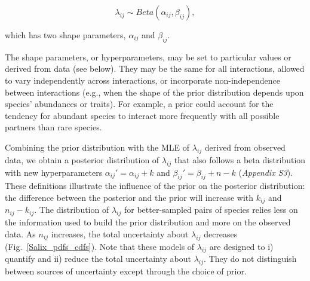 \documentclass[12pt]{article}
\begin{document}
\begin{spacing}{2.0}
    \begin{equation}
          \lambda_{ij} \sim Beta(\alpha_{ij},\beta_{ij}) , \label{prior}
        \end{equation}

        \noindent which has two shape parameters, $\alpha_{ij}$ and $\beta_{ij}$. 


    The shape parameters, or hyperparameters, may be set to particular values or derived from data (see below). They may be the same for all interactions, allowed to vary independently across interactions, or incorporate non-independence between interactions (e.g., when the shape of the prior distribution depends upon species' abundances or traits). For example, a prior could account for the tendency for abundant species to interact more frequently with all possible partners than rare species.


    Combining the prior distribution with the MLE of $\lambda_{ij}$ derived from observed data, we obtain a posterior distribution of $\lambda_{ij}$ that also follows a beta distribution with new hyperparameters $\alpha_{ij}'=\alpha_{ij}+k$ and $\beta_{ij}'=\beta_{ij}+n-k$ (\emph{Appendix S3}). These definitions illustrate the influence of the prior on the posterior distribution: the difference between the posterior and the prior will increase with $k_{ij}$ and $n_{ij}-k_{ij}$. The distribution of $\lambda_{ij}$ for better-sampled pairs of species relies less on the information used to build the prior distribution and more on the observed data. As $n_{ij}$ increases, the total uncertainty about $\lambda_{ij}$ decreases (Fig.~\ref{Salix_pdfs_cdfs}). Note that these models of $\lambda_{ij}$ are designed to i) quantify and ii) reduce the total uncertainty about $\lambda_{ij}$. They do not distinguish between sources of uncertainty except through the choice of prior.






\end{spacing}
\end{document}

